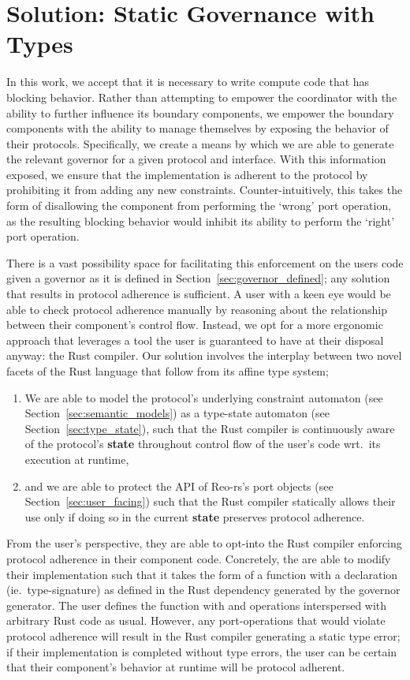 \section{Solution: Static Governance with Types}
\label{sec:soluition_static_governance}
In this work, we accept that it is necessary to write compute code that has blocking behavior. Rather than attempting to empower the coordinator with the ability to further influence its boundary components, we empower the boundary components with the ability to manage themselves by exposing the behavior of their protocols. Specifically, we create a means by which we are able to generate the relevant governor for a given protocol and interface. With this information exposed, we ensure that the implementation is adherent to the protocol by prohibiting it from adding any new constraints. Counter-intuitively, this takes the form of disallowing the component from performing the `wrong' port operation, as the resulting blocking behavior would inhibit its ability to perform the `right' port operation.

There is a vast possibility space for facilitating this enforcement on the users code given a governor as it is defined in Section~\ref{sec:governor_defined}; any solution that results in protocol adherence is sufficient. A user with a keen eye would be able to check protocol adherence manually by reasoning about the relationship between their component's control flow. Instead, we opt for a more ergonomic approach that leverages a tool the user is guaranteed to have at their disposal anyway: the Rust compiler. Our solution involves the interplay between two novel facets of the Rust language that follow from its affine type system; 
\begin{enumerate}
	\item We are able to model the protocol's underlying constraint automaton (see Section~\ref{sec:semantic_models}) as a type-state automaton (see Section~\ref{sec:type_state}), such that the Rust compiler is continuously aware of the protocol's \textbf{state} throughout control flow of the user's code wrt.\ its execution at runtime,
	
	\item and we are able to protect the API of Reo-rs's port objects (see Section~\ref{sec:user_facing}) such that the Rust compiler statically allows their use only if doing so in the current \textbf{state} preserves protocol adherence.
\end{enumerate}

From the user's perspective, they are able to opt-into the Rust compiler enforcing protocol adherence in their component code. Concretely, the are able to modify their implementation such that it takes the form of a function with a declaration (ie.\ type-signature) as defined in the Rust dependency generated by the governor generator. The user defines the function with  and  operations interspersed with arbitrary Rust code as usual. However, any port-operations that would violate protocol adherence will result in the Rust compiler generating a static type error; if their implementation is completed without type errors, the user can be certain that their component's behavior at runtime will be protocol adherent.

